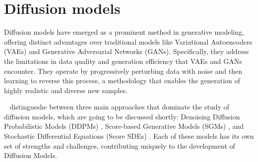 \section{Diffusion models}\label{diffusion Models}

Diffusion models have emerged as a prominent method in generative modeling, offering distinct advantages over traditional models like Variational Autoencoders (VAEs) and Generative Adversarial Networks (GANs). Specifically, they address the limitations in data quality and generation efficiency that VAEs and GANs encounter. They operate by progressively perturbing data with noise and then learning to reverse this process, a methodology that enables the generation of highly realistic and diverse new samples.

~\cite{yangdiffusionSummary} distingueshe between three main approaches that dominate the study of diffusion models, which are going to be discussed shortly: Denoising Diffusion Probabilistic Models (DDPMs) \citep{hoDDPMs,sohlDDPM}, Score-based Generative Models (SGMs) \citep{song2019SGM}, and Stochastic Differential Equations (Score SDEs) \citep{song2020score, song2021maximum}. Each of these models has its own set of strengths and challenges, contributing uniquely to the development of Diffusion Models.




